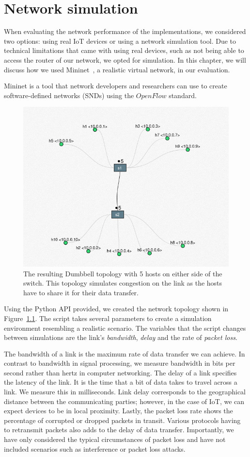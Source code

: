 \chapter{Network simulation}

When evaluating the network performance of the implementations, we considered two options: using real IoT devices or using a network simulation tool.
Due to technical limitations that came with using real devices, such as not being able to access the router of our network, we opted for simulation.
In this chapter, we will discuss how we used Mininet~\citep{lantz_mininet_2021}, a realistic virtual network, in our evaluation.

Mininet is a tool that network developers and researchers can use to create software-defined networks (SNDs) using the $OpenFlow$ standard.

\begin{figure}[ht]
    \centering
    \includegraphics[width=0.5\linewidth]{images/mininet_topo.png}
    \caption{The resulting Dumbbell topology with 5 hosts on either side of the switch. This topology simulates congestion on the link as the hosts have to share it for their data transfer.}
    \label{fig:mininet-topo}
\end{figure}

Using the Python API provided, we created the network topology shown in Figure~\ref{fig:mininet-topo}.
The script takes several parameters to create a simulation environment resembling a realistic scenario.
The variables that the script changes between simulations are the link's \textit{bandwidth}, \textit{delay} and the rate of \textit{packet loss}.

The bandwidth of a link is the maximum rate of data transfer we can achieve.
In contrast to bandwidth in signal processing, we measure bandwidth in bits per second rather than hertz in computer networking.
The delay of a link specifies the latency of the link.
It is the time that a bit of data takes to travel across a link. 
We measure this in milliseconds.
Link delay corresponds to the geographical distance between the communicating parties; however, in the case of IoT, we can expect devices to be in local proximity.
Lastly, the packet loss rate shows the percentage of corrupted or dropped packets in transit.
Various protocols having to retransmit packets also adds to the delay of data transfer.
Importantly, we have only considered the typical circumstances of packet loss and have not included scenarios such as interference or packet loss attacks.

